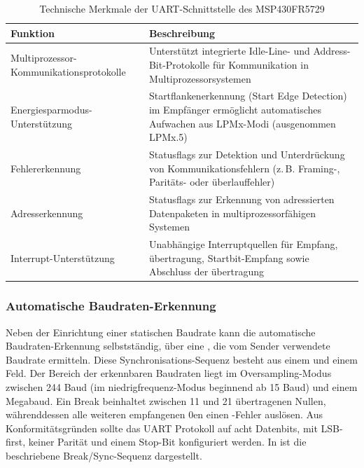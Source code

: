 \newpage
\begin{table}[h!]
	\small
	\centering
	\begin{tabular}{|p{6.5cm}|p{7cm}|}
		\hline
		\textbf{Funktion} & \textbf{Beschreibung} \\
		\hline
		Multiprozessor-Kommunikationsprotokolle & Unterst\"utzt integrierte Idle-Line- und Address-Bit-Protokolle f\"ur Kommunikation in Multiprozessorsystemen \\
		\hline
		Energiesparmodus-Unterst\"utzung & Startflankenerkennung (Start Edge Detection) im Empf\"anger erm\"oglicht automatisches Aufwachen aus LPMx-Modi (ausgenommen LPMx.5) \\
		\hline
		Fehlererkennung & Statusflags zur Detektion und Unterdr\"uckung von Kommunikationsfehlern (z.\,B. Framing-, Parit\"ats- oder \"uberlauffehler) \\
		\hline
		Adresserkennung & Statusflags zur Erkennung von adressierten Datenpaketen in multiprozessorf\"ahigen Systemen \\
		\hline
		Interrupt-Unterst\"utzung & Unabh\"angige Interruptquellen f\"ur Empfang, \"ubertragung, Startbit-Empfang sowie Abschluss der \"ubertragung \\
		\hline
	\end{tabular}
	\caption{Technische Merkmale der UART-Schnittstelle des MSP430FR5729\\}
	\label{tab:uart_features}
\end{table}

\subsubsection{Automatische Baudraten-Erkennung}
\label{sec:auto_baud}

Neben der Einrichtung einer statischen Baudrate kann die automatische Baudraten-Erkennung selbstst\"andig, \"uber eine , die vom Sender verwendete Baudrate ermitteln. Diese Synchronisations-Sequenz besteht aus einem  und einem  Feld. Der Bereich der erkennbaren Baudraten liegt im Oversampling-Modus zwischen 244 Baud (im niedrigfrequenz-Modus beginnend ab 15 Baud) und einem Megabaud. Ein Break beinhaltet zwischen 11 und 21 \"ubertragenen Nullen, w\"ahrenddessen alle weiteren empfangenen 0en einen -Fehler ausl\"osen. Aus Konformit\"atsgr\"unden sollte das UART Protokoll auf acht Datenbits, mit LSB-first, keiner Parit\"at und einem Stop-Bit konfiguriert werden. In  ist die beschriebene Break/Sync-Sequenz dargestellt.

